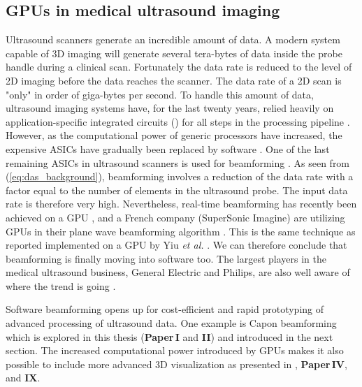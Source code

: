 
\subsection{GPUs in medical ultrasound imaging}
Ultrasound scanners generate an incredible amount of data. A modern system capable of 3D imaging will generate several tera-bytes of data inside the probe handle during a clinical scan. Fortunately the data rate is reduced to the level of 2D imaging before the data reaches the scanner. The data rate of a 2D scan is "only" in order of giga-bytes per second. To handle this amount of data, ultrasound imaging systems have, for the last twenty years, relied heavily on application-specific integrated circuits () for all steps in the processing pipeline \cite{Thomenius}. However, as the computational power of generic processors have increased, the expensive ASICs have gradually been replaced by software \cite{Guracar2013}. One of  the last remaining ASICs in ultrasound scanners is used for beamforming \cite{Thomenius}. As seen from (\ref{eq:das_background}), beamforming involves a reduction of the data rate with a factor equal to the number of elements in the ultrasound probe. The input data rate is therefore very high. Nevertheless, real-time beamforming has recently been achieved on a GPU \cite{Song2012}, and a French company (SuperSonic Imagine) are utilizing GPUs in their plane wave beamforming algorithm \cite{Tanter2014}. This is the same technique as reported implemented on a GPU by Yiu \textit{et al.} \cite{Yiu2011}. We can therefore conclude that beamforming is finally moving into software too. The largest players in the medical ultrasound business, General Electric and Philips, are also well aware of where the trend is going \cite{Thomenius2012} \cite{Metz2011}. 

Software beamforming opens up for cost-efficient and rapid prototyping of advanced processing of ultrasound data. One example is Capon beamforming which is explored in this thesis (\textbf{Paper\,I} and \textbf{II}) and introduced in the next section. The increased computational power introduced by GPUs makes it also possible to include more advanced 3D visualization as presented in \cite{solteszova2010multidirectional}, \textbf{Paper\,IV}, and \textbf{IX}.

